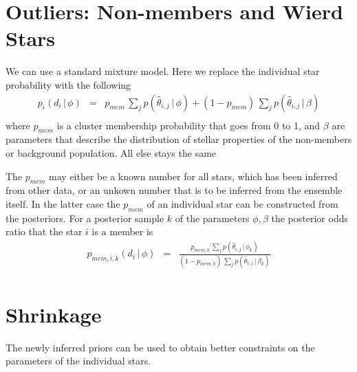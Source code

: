 \documentclass[modern]{aastex6}
\newcommand{\given}{\,|\,}
\begin{document}
\section{Outliers: Non-members and Wierd Stars}

We can use a standard mixture model. 
Here we replace the individual star probability with the following
\begin{eqnarray}
p_i(d_i \given \phi) & = & p_{mem} \, \sum_j p(\hat{\theta}_{i,j} \given \phi) + (1-p_{mem}) \, \sum_j p(\hat{\theta}_{i,j} \given \beta)\\
\end{eqnarray}
where $p_{mem}$ is a cluster membership probability that goes from 0 to 1,
and $\beta$ are parameters that describe the distribution of stellar properties of the non-members or background population.
All else stays the same

The $p_{mem}$ may either be a known number for all stars, which has been
inferred from other data, or an unkown number that is to be inferred from the ensemble itself.  
In the latter case the $p_{mem}$ of an individual star can be constructed from the posteriors.
For a posterior sample $k$ of the parameters $\phi, \beta$ the posterior odds ratio that the star $i$ is a member is
\begin{eqnarray}
p_{mem, i, k}(d_i \given \phi) & = & \frac{p_{mem, k} \, \sum_j p(\hat{\theta}_{i,j} \given \phi_k)}{(1-p_{mem, k}) \, \sum_j p(\hat{\theta}_{i,j} \given \beta_k)}\\
\end{eqnarray}



\section{Shrinkage}
The newly inferred priors can be used to obtain better constraints on the parameters of the individual stars.
\end{document}
